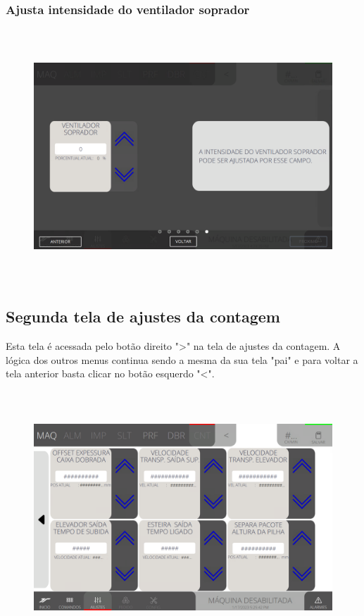 \newpage
\thispagestyle{fancy}
\vspace*{40 pt}
\subsubsection{\small{Ajusta intensidade do ventilador soprador}}
\vspace*{\fill}
\begin{figure}[h]
  \centering
  \includegraphics[width=576px,height=360px]{src/imagesFlexo/08-count/settings/e-6.png}
\end{figure}
\vspace*{\fill}

\newpage
\thispagestyle{fancy}
\vspace*{40 pt}
\subsection{Segunda tela de ajustes da contagem}
Esta tela é acessada pelo botão direito "\textgreater" na tela de ajustes da contagem. A lógica dos outros menus continua sendo a mesma da sua tela "pai" e para voltar a tela anterior basta clicar no botão esquerdo "\textless{}".
\vspace*{\fill}
\begin{figure}[h]
  \centering
  \includegraphics[width=576px,height=360px]{src/imagesFlexo/08-count/settings/e-Tela-Principal-2.png}
\end{figure}
\vspace*{\fill}

